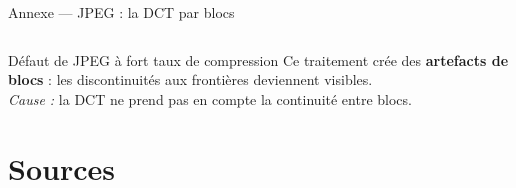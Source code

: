 \documentclass[10pt]{beamer}
\begin{document}
\begin{frame}{Annexe — JPEG : la DCT par blocs}
\begin{columns}[T]
		\end{columns}
		
		\begin{alertblock}{Défaut de JPEG à fort taux de compression}
			Ce traitement crée des
			\textbf{artefacts de blocs} : les discontinuités aux frontières
			deviennent visibles.\\[3pt]
			\emph{Cause :} la DCT ne prend pas en compte la continuité entre blocs.
		\end{alertblock}
		
	\end{frame}
	
	\section*{Sources}
	
\end{document}
